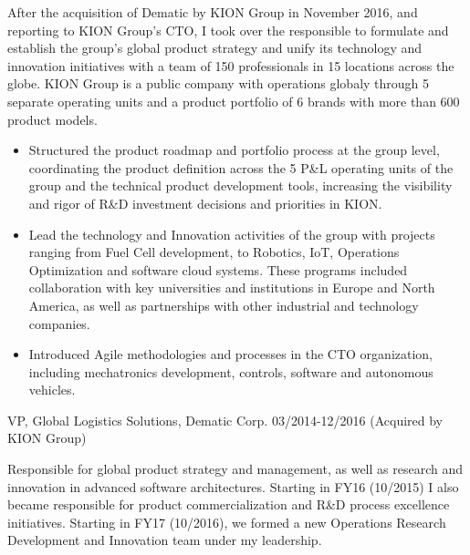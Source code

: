 \documentclass{res}
\begin{document}
\begin{resume}
After the acquisition of Dematic by KION Group in November 2016, and reporting to KION Group's CTO, I took over the responsible to formulate and establish the group's global product strategy and unify its technology and innovation initiatives with a team of 150 professionals in 15 locations across the globe. KION Group is a public company with operations globaly through 5 separate operating units and a product portfolio of 6 brands with more than 600 product models.
\begin{itemize}
    \item Structured the product roadmap and portfolio process at the group level, coordinating the product definition across the 5 P\&L operating units of the group and the technical product development tools, increasing the visibility and rigor of R\&D investment decisions and priorities in KION.
    \item Lead the technology and Innovation activities of the group with projects ranging from Fuel Cell development, to Robotics, IoT, Operations Optimization and software cloud systems. These programs included collaboration with key universities and institutions in Europe and North America, as well as partnerships with other industrial and technology companies.
    \item Introduced Agile methodologies and processes in the CTO organization, including mechatronics development, controls, software and autonomous vehicles.
\end{itemize}

\begin{bf}
VP, Global Logistics Solutions, Dematic Corp. 03/2014-12/2016
(Acquired by KION Group)
\end{bf}

Responsible for global product strategy and management, as well as research and innovation in advanced software architectures. Starting in FY16 (10/2015) I also became responsible for product commercialization and R\&D process excellence initiatives. Starting in FY17 (10/2016), we formed a new Operations Research Development and Innovation team under my leadership.


\end{resume}
\end{document}
